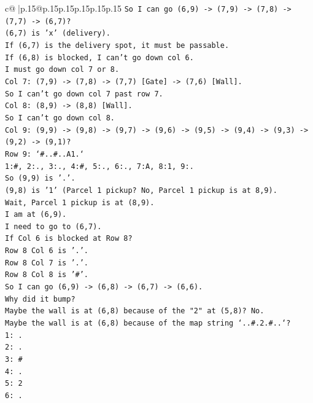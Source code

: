 \documentclass{article}
\begin{document}
{\begin{supertabular}{c@{$\;$}|p{.15\linewidth}@{}p{.15\linewidth}p{.15\linewidth}p{.15\linewidth}p{.15\linewidth}p{.15\linewidth}}
{{{\texttt{So I can go (6,9) {-}> (7,9) {-}> (7,8) {-}> (7,7) {-}> (6,7)?} \\
\texttt{(6,7) is 'x' (delivery).} \\
\texttt{If (6,7) is the delivery spot, it must be passable.} \\
\texttt{If (6,8) is blocked, I can't go down col 6.} \\
\texttt{I must go down col 7 or 8.} \\
\texttt{Col 7: (7,9) {-}> (7,8) {-}> (7,7) {[}Gate{]} {-}> (7,6) {[}Wall{]}.} \\
\texttt{So I can't go down col 7 past row 7.} \\
\texttt{Col 8: (8,9) {-}> (8,8) {[}Wall{]}.} \\
\texttt{So I can't go down col 8.} \\
\texttt{Col 9: (9,9) {-}> (9,8) {-}> (9,7) {-}> (9,6) {-}> (9,5) {-}> (9,4) {-}> (9,3) {-}> (9,2) {-}> (9,1)?} \\
\texttt{Row 9: `\#..\#..A1.`} \\
\texttt{1:\#, 2:., 3:., 4:\#, 5:., 6:., 7:A, 8:1, 9:.} \\
\texttt{So (9,9) is '.'.} \\
\texttt{(9,8) is '1' (Parcel 1 pickup? No, Parcel 1 pickup is at 8,9).} \\
\texttt{Wait, Parcel 1 pickup is at (8,9).} \\
\texttt{I am at (6,9).} \\
\texttt{I need to go to (6,7).} \\
\texttt{If Col 6 is blocked at Row 8?} \\
\texttt{Row 8 Col 6 is '.'.} \\
\texttt{Row 8 Col 7 is '.'.} \\
\texttt{Row 8 Col 8 is '\#'.} \\
\texttt{So I can go (6,9) {-}> (6,8) {-}> (6,7) {-}> (6,6).} \\
\texttt{Why did it bump?} \\
\texttt{Maybe the wall is at (6,8) because of the "2" at (5,8)? No.} \\
\texttt{Maybe the wall is at (6,8) because of the map string `..\#.2.\#..`?} \\
\texttt{1: .} \\
\texttt{2: .} \\
\texttt{3: \#} \\
\texttt{4: .} \\
\texttt{5: 2} \\
\texttt{6: .} \\
}}}
\end{supertabular}}
\end{document}
